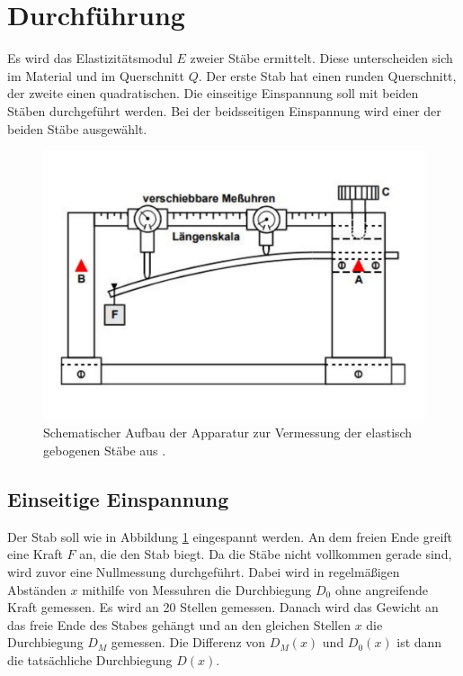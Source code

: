 \section{Durchführung}
\label{sec:Durchführung}
Es wird das Elastizitätsmodul $E$ zweier Stäbe ermittelt.
Diese unterscheiden sich im Material und im Querschnitt $Q$.
Der erste Stab hat einen runden Querschnitt, der zweite einen quadratischen.
Die einseitige Einspannung soll mit beiden Stäben durchgeführt werden.
Bei der beidsseitigen Einspannung wird einer der beiden Stäbe ausgewählt.
\begin{figure}
    \centering
    \includegraphics[width=\textwidth]{Messapparat.pdf} 
    \caption{Schematischer Aufbau der Apparatur zur Vermessung der elastisch gebogenen Stäbe aus \cite{anleitung}.}
    \label{fig:Messapparat}
\end{figure}
\subsection{Einseitige Einspannung}
\label{subsec:einseitigeEinspannung}
Der Stab soll wie in Abbildung \ref{fig:Messapparat} eingespannt werden.
An dem freien Ende greift eine Kraft $F$ an, die den Stab biegt.
Da die Stäbe nicht vollkommen gerade sind, wird zuvor eine Nullmessung durchgeführt.
Dabei wird in regelmäßigen Abständen $x$ mithilfe von Messuhren die Durchbiegung $D_0$ ohne angreifende Kraft gemessen.
Es wird an 20 Stellen gemessen.
Danach wird das Gewicht an das freie Ende des Stabes gehängt und an den gleichen Stellen $x$ die Durchbiegung $D_M$ gemessen.
Die Differenz von $D_M(x)$ und $D_0(x)$ ist dann die tatsächliche Durchbiegung $D(x)$.

